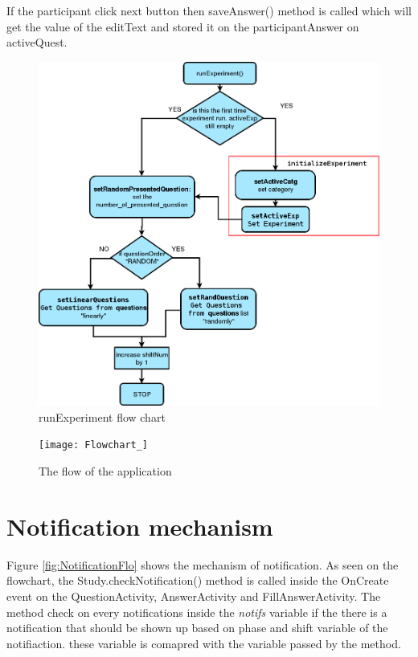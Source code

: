 If the participant click next button then saveAnswer() method is called which will get the value of the editText and stored it on the participantAnswer on activeQuest.



\begin{figure}
\begin{center}
\includegraphics[scale=0.5]{runExperiment}
\end{center}
\caption{runExperiment flow chart}
\label{fig:runExperiment_flow}
\end{figure}


\begin{figure}
\begin{center}
\texttt{[image: Flowchart\_]}
\end{center}
\caption{The flow of the application}
\label{fig:RunExpflowApp}
\end{figure}

\section{Notification mechanism}
Figure \ref{fig:NotificationFlo} shows the mechanism of notification.
As seen on the flowchart, the Study.checkNotification() method is called inside the OnCreate event on the QuestionActivity, AnswerActivity and FillAnswerActivity. The method check on every notifications inside the \textit{notifs} variable if the there is a notification that should be shown up based on phase and shift variable of the notifiaction. these variable is comapred with the variable passed by the method.

